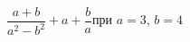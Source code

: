 \begin{ex}[type=expr_calc]
	\begin{condition}
		\( \dfrac{a+b}{a^2-b^2}+a+\dfrac{b}{a} \)\hspace{0.5cm}при \( a=3 \), \( b=4 \)
	\end{condition}
\end{ex}